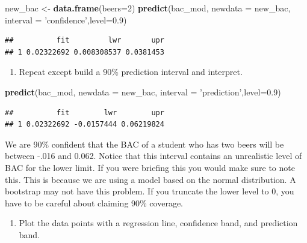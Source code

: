 \documentclass[
]{book}
\newenvironment{Shaded}{\begin{snugshade}}{\end{snugshade}}
\newcommand{\DataTypeTok}[1]{\textcolor[rgb]{0.13,0.29,0.53}{#1}}
\newcommand{\DecValTok}[1]{\textcolor[rgb]{0.00,0.00,0.81}{#1}}
\newcommand{\FloatTok}[1]{\textcolor[rgb]{0.00,0.00,0.81}{#1}}
\newcommand{\KeywordTok}[1]{\textcolor[rgb]{0.13,0.29,0.53}{\textbf{#1}}}
\newcommand{\NormalTok}[1]{#1}
\newcommand{\StringTok}[1]{\textcolor[rgb]{0.31,0.60,0.02}{#1}}
\providecommand{\tightlist}{%
  \setlength{\itemsep}{0pt}\setlength{\parskip}{0pt}}
\begin{document}
\begin{Shaded}
\begin{Highlighting}[]
\NormalTok{new_bac <-}\StringTok{ }\KeywordTok{data.frame}\NormalTok{(}\DataTypeTok{beers=}\DecValTok{2}\NormalTok{)}
\KeywordTok{predict}\NormalTok{(bac_mod, }\DataTypeTok{newdata =}\NormalTok{ new_bac, }\DataTypeTok{interval =} \StringTok{'confidence'}\NormalTok{,}\DataTypeTok{level=}\FloatTok{0.9}\NormalTok{)}
\end{Highlighting}
\end{Shaded}

\begin{verbatim}
##          fit         lwr       upr
## 1 0.02322692 0.008308537 0.0381453
\end{verbatim}

\begin{enumerate}
\def\labelenumi{\alph{enumi}.}
\setcounter{enumi}{7}
\tightlist
\item
  Repeat except build a 90\% prediction interval and interpret.
\end{enumerate}

\begin{Shaded}
\begin{Highlighting}[]
\KeywordTok{predict}\NormalTok{(bac_mod, }\DataTypeTok{newdata =}\NormalTok{ new_bac, }\DataTypeTok{interval =} \StringTok{'prediction'}\NormalTok{,}\DataTypeTok{level=}\FloatTok{0.9}\NormalTok{)}
\end{Highlighting}
\end{Shaded}

\begin{verbatim}
##          fit        lwr        upr
## 1 0.02322692 -0.0157444 0.06219824
\end{verbatim}

We are 90\% confident that the BAC of a student who has two beers will be between -.016 and 0.062. Notice that this interval contains an unrealistic level of BAC for the lower limit. If you were briefing this you would make sure to note this. This is because we are using a model based on the normal distribution. A bootstrap may not have this problem. If you truncate the lower level to 0, you have to be careful about claiming 90\% coverage.

\begin{enumerate}
\def\labelenumi{\roman{enumi}.}
\tightlist
\item
  Plot the data points with a regression line, confidence band, and prediction band.
\end{enumerate}
\end{document}
